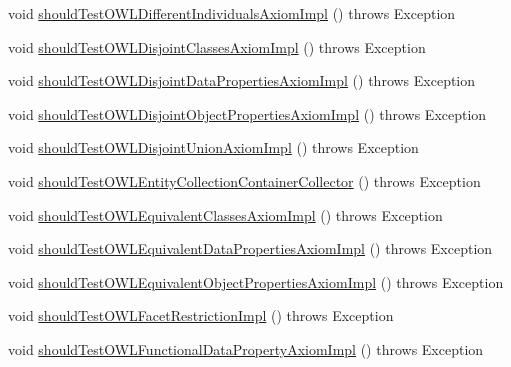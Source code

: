 \begin{DoxyCompactItemize}
\item 
void \hyperlink{classorg_1_1semanticweb_1_1owlapi_1_1contract_1_1_contract_owlapi__2_test_abe5d95f2046ca4e0af0d55760c822117}{should\-Test\-O\-W\-L\-Different\-Individuals\-Axiom\-Impl} ()  throws Exception 
\item 
void \hyperlink{classorg_1_1semanticweb_1_1owlapi_1_1contract_1_1_contract_owlapi__2_test_abd3687d36d493d8f07d7f4761b2c6086}{should\-Test\-O\-W\-L\-Disjoint\-Classes\-Axiom\-Impl} ()  throws Exception 
\item 
void \hyperlink{classorg_1_1semanticweb_1_1owlapi_1_1contract_1_1_contract_owlapi__2_test_a84f336202efaebeb38f1ba720fa2b328}{should\-Test\-O\-W\-L\-Disjoint\-Data\-Properties\-Axiom\-Impl} ()  throws Exception 
\item 
void \hyperlink{classorg_1_1semanticweb_1_1owlapi_1_1contract_1_1_contract_owlapi__2_test_a95055ce18bf272a0725feef03c5468e6}{should\-Test\-O\-W\-L\-Disjoint\-Object\-Properties\-Axiom\-Impl} ()  throws Exception 
\item 
void \hyperlink{classorg_1_1semanticweb_1_1owlapi_1_1contract_1_1_contract_owlapi__2_test_a81de14effa43d22d8dd9e02a58a98970}{should\-Test\-O\-W\-L\-Disjoint\-Union\-Axiom\-Impl} ()  throws Exception 
\item 
void \hyperlink{classorg_1_1semanticweb_1_1owlapi_1_1contract_1_1_contract_owlapi__2_test_af61df1af426d8465f5fa1339bb8427e3}{should\-Test\-O\-W\-L\-Entity\-Collection\-Container\-Collector} ()  throws Exception 
\item 
void \hyperlink{classorg_1_1semanticweb_1_1owlapi_1_1contract_1_1_contract_owlapi__2_test_a9fa92b8ecf138fd4769644486cda25d6}{should\-Test\-O\-W\-L\-Equivalent\-Classes\-Axiom\-Impl} ()  throws Exception 
\item 
void \hyperlink{classorg_1_1semanticweb_1_1owlapi_1_1contract_1_1_contract_owlapi__2_test_ae4f9b8f00a6ba9dec18fa6605387bc21}{should\-Test\-O\-W\-L\-Equivalent\-Data\-Properties\-Axiom\-Impl} ()  throws Exception 
\item 
void \hyperlink{classorg_1_1semanticweb_1_1owlapi_1_1contract_1_1_contract_owlapi__2_test_a3cd33a21c7f9990220213e42044eee8f}{should\-Test\-O\-W\-L\-Equivalent\-Object\-Properties\-Axiom\-Impl} ()  throws Exception 
\item 
void \hyperlink{classorg_1_1semanticweb_1_1owlapi_1_1contract_1_1_contract_owlapi__2_test_a5f48b5a842f5bbd84e337690724495ce}{should\-Test\-O\-W\-L\-Facet\-Restriction\-Impl} ()  throws Exception 
\item 
void \hyperlink{classorg_1_1semanticweb_1_1owlapi_1_1contract_1_1_contract_owlapi__2_test_ab7a4e373d30dc43b26dd81d0ea6f7bb0}{should\-Test\-O\-W\-L\-Functional\-Data\-Property\-Axiom\-Impl} ()  throws Exception 

\end{DoxyCompactItemize}
